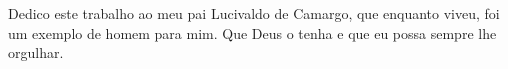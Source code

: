 \begin{dedicatoria}
Dedico este trabalho ao meu pai Lucivaldo de Camargo, que enquanto viveu, foi um exemplo de homem para mim. Que Deus o tenha e que eu possa sempre lhe orgulhar.
\end{dedicatoria}